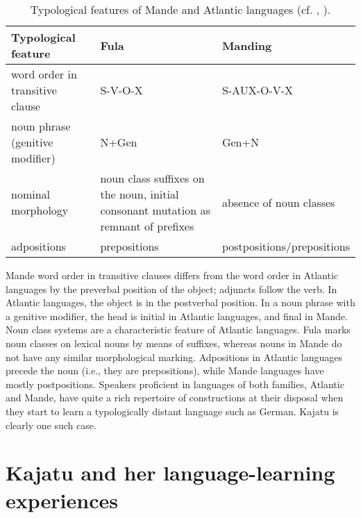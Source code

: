 \documentclass[output=paper]{langscibook}
\begin{document}
\begin{table}
    \begin{tabularx}{\textwidth}{QQQ}\midrule\toprule
        Typological feature               & Fula         & Manding                     \\\midrule
        word order in   transitive clause 
        & S-V-O-X   & S-AUX-O-V-X                 \\
        noun phrase (genitive   modifier) & N+Gen & Gen+N                       \\
        \tablevspace
        nominal morphology                & noun class suffixes   on the noun, initial consonant mutation as remnant of prefixes & absence of noun   classes \\
        \tablevspace
        adpositions                       & prepositions                                                                           & postpositions{\slash}prepositions\\ \bottomrule\midrule
    \end{tabularx}
    \caption{Typological features of Mande and Atlantic languages (cf. \citealt[151]{guldemann_languages_2018}, \citealt[18–22]{williamson_niger-congo_2000}).}
    \label{fanego:tab:feat_mnd_atl_lngs}
\end{table}

\largerpage
Mande word order in transitive clauses differs from the word order in Atlantic languages by the preverbal position of the object; adjuncts follow the verb. In Atlantic languages, the object is in the postverbal position. In a noun phrase with a genitive modifier, the head is initial in Atlantic languages, and final in Mande. Noun class systems are a characteristic feature of Atlantic languages. Fula marks noun classes on lexical nouns by means of suffixes, whereas nouns in Mande do not have any similar morphological marking. Adpositions in Atlantic languages precede the noun (i.e., they are prepositions), while Mande languages have mostly postpositions. Speakers proficient in languages of both families, Atlantic and Mande, have quite a rich repertoire of constructions at their disposal when they start to learn a typologically distant language such as German. Kajatu is clearly one such case.

\section{Kajatu and her language-learning experiences}\label{fanego:sec:4}
\end{document}
